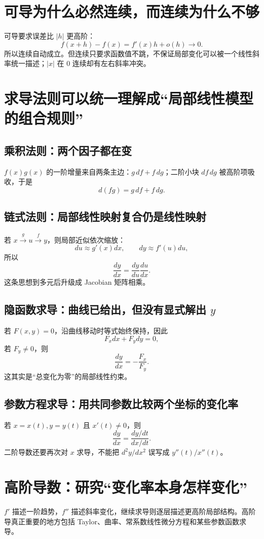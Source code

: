\documentclass[11pt,a4paper,openany]{ctexbook}
\begin{document}
\section{可导为什么必然连续，而连续为什么不够}
可导要求误差比 $\lvert h\rvert$ 更高阶：
\[
f(x+h)-f(x)=f'(x)h+o(h)\to0.
\]
所以连续自动成立。但连续只要求函数值不跳，不保证局部变化可以被一个线性斜率统一描述；$\lvert x\rvert$ 在 0 连续却有左右斜率冲突。

\section{求导法则可以统一理解成“局部线性模型的组合规则”}
\subsection{乘积法则：两个因子都在变}
$f(x)g(x)$ 的一阶增量来自两条主边：$g\,df+f\,dg$；二阶小块 $df\,dg$ 被高阶项吸收，于是
\[
d(fg)=g\,df+f\,dg.
\]

\subsection{链式法则：局部线性映射复合仍是线性映射}
若 $x\xrightarrow{g}u\xrightarrow{f}y$，则局部近似依次缩放：
\[
du\approx g'(x)dx,\qquad dy\approx f'(u)du,
\]
所以
\[
\boxed{\frac{dy}{dx}=\frac{dy}{du}\frac{du}{dx}}.
\]
这条思想到多元后升级成 Jacobian 矩阵相乘。

\subsection{隐函数求导：曲线已给出，但没有显式解出 \texorpdfstring{$y$}{y}}
若 $F(x,y)=0$，沿曲线移动时等式始终保持，因此
\[
F_xdx+F_y dy=0,
\]
若 $F_y\neq0$，则
\[
\frac{dy}{dx}=-\frac{F_x}{F_y}.
\]
这其实是“总变化为零”的局部线性约束。

\subsection{参数方程求导：用共同参数比较两个坐标的变化率}
若 $x=x(t),y=y(t)$ 且 $x'(t)\neq0$，则
\[
\frac{dy}{dx}=\frac{dy/dt}{dx/dt}.
\]
二阶导数还要再次对 $x$ 求导，不能把 $d^2y/dx^2$ 误写成 $y''(t)/x''(t)$。

\section{高阶导数：研究“变化率本身怎样变化”}
$f'$ 描述一阶趋势，$f''$ 描述斜率变化，继续求导则逐层描述更高阶局部结构。高阶导真正重要的地方包括 Taylor、曲率、常系数线性微分方程和某些参数函数求导。
\end{document}
